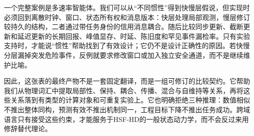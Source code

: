 一个完整案例是多速率智能体。我们可以从“不同惯性”得到快慢层假说，但实现时必须回到离散时钟、窗口、状态所有权和消息版本：快层处理局部观测，慢层修订较持久的结构，二者通过带任务身份的信用消息耦合。随后比较同步更新、截断更新和延迟更新的长期回报、峰值显存、时延、陈旧度和罕见事件漏检率。只有实验支持时，才能说“惯性”帮助找到了有效设计；它仍不是设计正确性的原因。若快慢分层漏掉突发危险事件，反例就要求修改窗口或加入独立安全通道，而不是继续维护比喻。

因此，这张表的最终产物不是一套固定翻译，而是一组可修订的比较契约。它帮助我们从物理词汇中提取局部性、保持、耦合、传播、混合与自维持等关系，再将这些关系落到有类型的计算对象和可重复实验上。它也明确拒绝三种推理：数值相似不推出整体同构，预测有效不推出机制同一，工程目标下降不推出任务成功。跨域语言只有接受这些约束，才能服务于HSF-HD的一般状态动力学，而不会反过来用修辞替代理论。
